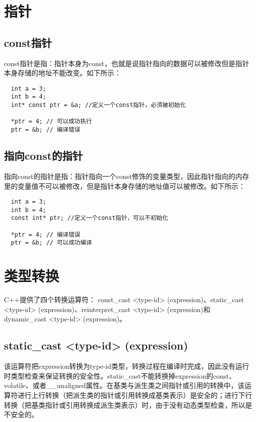 \section{指针}
\subsection{const指针}\label{c/ptr/constptr}
const指针是指：指针本身为const，也就是说指针指向的数据可以被修改但是指针本身存储的地址不能改变。如下所示：
\begin{verbatim}
  int a = 3;
  int b = 4;
  int* const ptr = &a; //定义一个const指针，必须被初始化

  *ptr = 4; // 可以成功执行
  ptr = &b; // 编译错误
\end{verbatim}
\subsection{指向const的指针}\label{c/ptr/ptr2const}
指向const的指针是指：指针指向一个const修饰的变量类型，因此指针指向的内存里的变量值不可以被修改，但是指针本身存储的地址值可以被修改。如下所示：
\begin{verbatim}
  int a = 3;
  int b = 4;
  const int* ptr; //定义一个const指针，可以不初始化

  *ptr = 4; // 编译错误
  ptr = &b; // 可以成功编译
\end{verbatim}
\section{类型转换}
C++提供了四个转换运算符：
const\_cast <type-id> (expression)、static\_cast <type-id> (expression)、reinterpret\_cast <type-id> (expression)和dynamic\_cast <type-id> (expression)。
\subsection{static\_cast <type-id> (expression)}\label{c/type/static}
该运算符把expression转换为type-id类型，转换过程在编译时完成，因此没有运行时类型检查来保证转换的安全性。static\_cast不能转换掉expression的const、volatile、或者\_\_unaligned属性。在基类与派生类之间指针或引用的转换中，该运算符进行上行转换（把派生类的指针或引用转换成基类表示）是安全的；进行下行转换（把基类指针或引用转换成派生类表示）时，由于没有动态类型检查，所以是不安全的。
